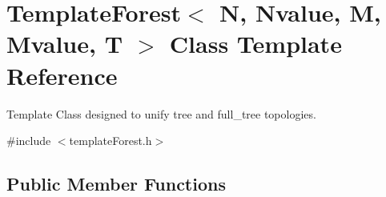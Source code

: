 \hypertarget{classTemplateForest}{}\section{Template\+Forest$<$ N, Nvalue, M, Mvalue, T $>$ Class Template Reference}
\label{classTemplateForest}


Template Class designed to unify tree and full\+\_\+tree topologies.  




{\ttfamily \#include $<$template\+Forest.\+h$>$}

\subsection*{Public Member Functions}
